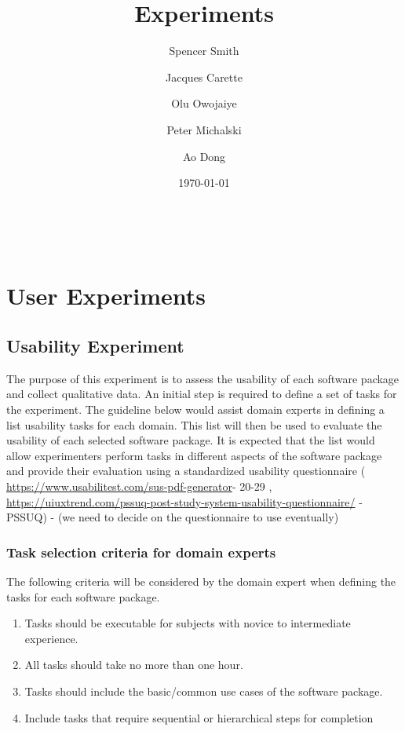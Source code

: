 \documentclass[letterpaper,cleveref]{lipics-v2019}
\title{Experiments}
\author{Spencer Smith}{McMaster University, Canada}{smiths@mcmaster.ca}{}{}
\author{Jacques Carette}{McMaster University, Canada}{carette@mcmaster.ca}{}{}
\author{Olu Owojaiye}{McMaster University, Canada}{owojaiyo@mcmaster.ca}{}{}
\author{Peter Michalski}{McMaster University, Canada}{michap@mcmaster.ca}{}{}
\author{Ao Dong}{McMaster University, Canada}{donga9@mcmaster.ca}{}{}
\date{\today}
\theoremstyle{definition}
\begin{document}
\maketitle

~\newpage
\section{User Experiments}
\subsection{Usability Experiment}
The purpose of this experiment is to assess the usability of each software package and collect qualitative data. An initial step is required to define a set of tasks for the experiment. The guideline below would assist domain experts in defining a list usability tasks for each domain.
This list will then be used to evaluate the usability of each selected software package. It is expected that the list would allow experimenters perform tasks in  different aspects of the software package and provide their evaluation using a standardized usability questionnaire ( \url{https://www.usabilitest.com/sus-pdf-generator}- 20-29 , \url{https://uiuxtrend.com/pssuq-post-study-system-usability-questionnaire/} - PSSUQ) - (we need to decide on the questionnaire to use eventually)


\subsubsection{Task selection criteria for domain experts}
The following criteria will be considered by the domain expert when defining the tasks for each software package.

\begin {enumerate}
\item Tasks should be executable for subjects with novice to intermediate experience.
\item All tasks should take no more than one hour.
\item Tasks should include the basic/common use cases of the software package.
\item Include tasks that require sequential or hierarchical steps for completion

\end {enumerate}
\end{document}
